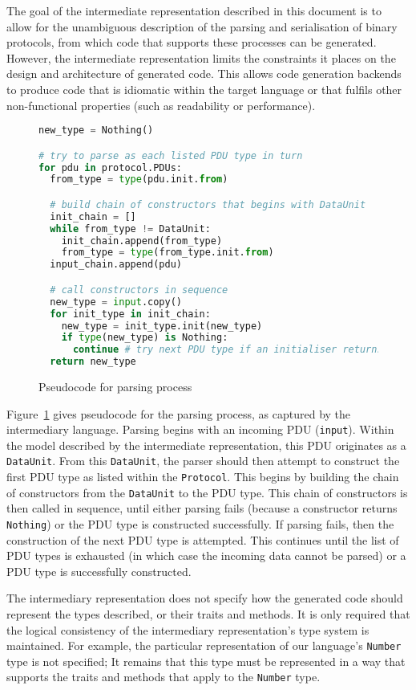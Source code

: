 \documentclass[10pt,twocolumn,a4paper]{article}
\newcommand{\code}[1]{\texttt{#1}}
\begin{document}
The goal of the intermediate representation described in this document is to
allow for the unambiguous description of the parsing and serialisation of
binary protocols, from which code that supports these processes can be
generated. However, the intermediate representation limits the constraints it
places on the design and architecture of generated code. This allows
code generation backends to produce code that is idiomatic within the target
language or that fulfils other non-functional properties (such as readability or
performance).

\begin{figure}
\begin{lstlisting}[language=Python]
new_type = Nothing()

# try to parse as each listed PDU type in turn
for pdu in protocol.PDUs:
  from_type = type(pdu.init.from)

  # build chain of constructors that begins with DataUnit
  init_chain = []
  while from_type != DataUnit:
    init_chain.append(from_type)
    from_type = type(from_type.init.from)
  input_chain.append(pdu)

  # call constructors in sequence
  new_type = input.copy()
  for init_type in init_chain:
    new_type = init_type.init(new_type)
    if type(new_type) is Nothing:
      continue # try next PDU type if an initialiser returns Nothing
  return new_type
\end{lstlisting}
\caption{Pseudocode for parsing process}
\label{fig:parsing-pseudocode}
\end{figure}

Figure~\ref{fig:parsing-pseudocode} gives pseudocode for the parsing process, as
captured by the intermediary language. Parsing begins with an incoming PDU
(\code{input}). Within the model described by the intermediate representation,
this PDU originates as a \code{DataUnit}. From this \code{DataUnit}, the
parser should then attempt to construct the first PDU type as listed within the
\code{Protocol}. This begins by building the chain of constructors from the
\code{DataUnit} to the PDU type. This chain of constructors is then called in
sequence, until either parsing fails (because a constructor returns
\code{Nothing}) or the PDU type is constructed successfully. If parsing fails,
then the construction of the next PDU type is attempted. This continues until
the list of PDU types is exhausted (in which case the incoming data cannot be
parsed) or a PDU type is successfully constructed.

The intermediary representation does not specify how the generated code should
represent the types described, or their traits and methods. It is only required
that the logical consistency of the intermediary representation's type system
is maintained. For example, the particular representation of our language's
\code{Number} type is not specified; It remains that this type must be
represented in a way that supports the traits and methods that apply to the
\code{Number} type.
\end{document}
